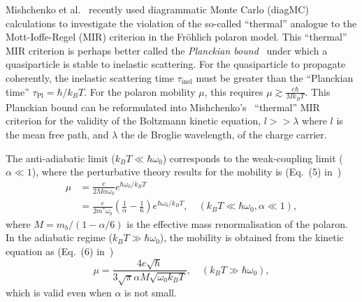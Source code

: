 Mishchenko et al.~\cite{mishchenko_polaron_2019} recently used diagrammatic Monte Carlo (diagMC) calculations to investigate the violation of the so-called ``thermal'' analogue to the Mott-Ioffe-Regel (MIR) criterion in the Fr\"ohlich polaron model. This ``thermal'' MIR criterion is perhaps better called the \emph{Planckian bound}~\cite{hartnoll_colloquium_2022} under which a quasiparticle is stable to inelastic scattering. 
For the quasiparticle to propagate coherently, the inelastic scattering time $\tau_{\text{inel}}$ must be greater than the ``Planckian time'' $\tau_{\text{Pl}} = \hbar / k_B T$. For the polaron mobility $\mu$, this requires $\mu \gtrsim \frac{e\hbar}{M k_B T}$. This Planckian bound can be reformulated into Mishchenko's~\cite{mishchenko_polaron_2019} ``thermal'' MIR criterion for the validity of the Boltzmann kinetic equation, $l >> \lambda$ where $l$ is the mean free path, and $\lambda$ the de Broglie wavelength, of the charge carrier.

The anti-adiabatic limit ($k_BT \ll \hbar\omega_0$) corresponds to the weak-coupling limit ($\alpha \ll 1$), where the perturbative theory results for the mobility is (Eq.~(5) in~\cite{mishchenko_polaron_2019})
\begin{equation}\label{eqn:coldmobility}
    \begin{aligned}
        \mu &= \frac{e}{2M\alpha\omega_0} e^{\hbar \omega_0/k_BT} \\ 
        &= \frac{e}{2m^*\omega_0} \left(\frac{1}{\alpha} - \frac{1}{6}\right) e^{\hbar \omega_0/k_BT}, \quad (k_BT \ll \hbar\omega_0, \alpha \ll 1),
    \end{aligned}
\end{equation}
where $M = m_b / (1 - \alpha / 6)$ is the effective mass renormalisation of the polaron. In the adiabatic regime ($k_B T \gg \hbar\omega_0$), the mobility is obtained from the kinetic equation as (Eq.~(6) in~\cite{mishchenko_polaron_2019})
\begin{equation}\label{eqn:hotmobility}
    \mu = \frac{4 e \sqrt{\hbar}}{3\sqrt{\pi}\alpha M \sqrt{\omega_0 k_B T}}, \quad (k_BT \gg \hbar\omega_0),
\end{equation}
which is valid even when $\alpha$ is not small.

